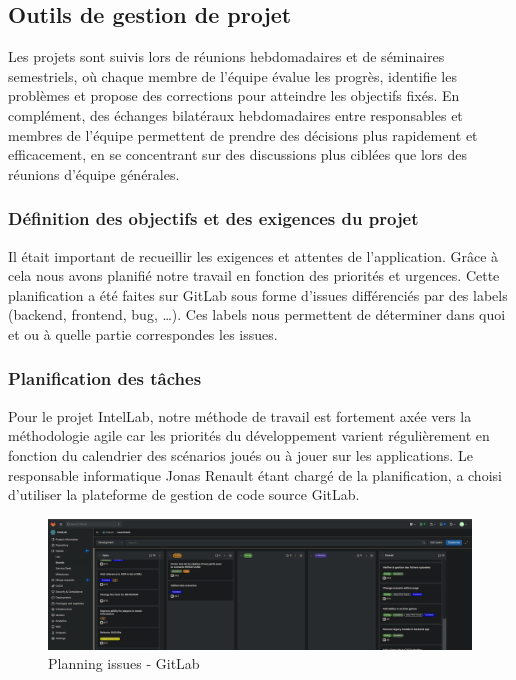 \subsection{Outils de gestion de projet}

Les projets sont suivis lors de réunions hebdomadaires et de séminaires semestriels, où chaque membre de l'équipe évalue les progrès, identifie les problèmes et propose des corrections pour atteindre les objectifs fixés.
En complément, des échanges bilatéraux hebdomadaires entre responsables et membres de l'équipe permettent de prendre des décisions plus rapidement et efficacement, en se concentrant sur des discussions plus ciblées que lors des réunions d'équipe générales.

\subsubsection{Définition des objectifs et des exigences du projet}

Il était important de recueillir les exigences et attentes de l’application.
Grâce à cela nous avons planifié notre travail en fonction des priorités et urgences. Cette planification a été faites sur GitLab sous forme d’issues différenciés par des labels (backend, frontend, bug, …).
Ces labels nous permettent de déterminer dans quoi et ou à quelle partie correspondes les issues.

\subsubsection{Planification des tâches}

Pour le projet IntelLab, notre méthode de travail est fortement axée vers la méthodologie agile car les priorités du développement varient régulièrement en fonction du calendrier des scénarios joués ou à jouer sur les applications.
Le responsable informatique Jonas Renault étant chargé de la planification, a choisi d'utiliser la plateforme de gestion de code source GitLab.

\begin{figure}[h]
	\center
	\includegraphics[width=\textwidth]{./images/gitlab_intellab.PNG}
	\caption[Planification des issues]{Planning issues - GitLab}\label{fig:gitlab_intellab}
\end{figure}

